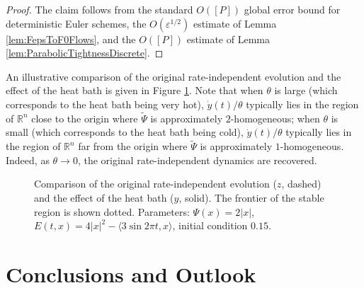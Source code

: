 \documentclass[reqno]{amsart}
\theoremstyle{definition}
\begin{document}
\begin{proof}
	The claim follows from the standard $O([P])$ global error bound for deterministic Euler schemes, the $O({\varepsilon}^{1/2})$ estimate of Lemma \ref{lem:FepsToF0Flows}, and the $O([P])$ estimate of Lemma \ref{lem:ParabolicTightnessDiscrete}.
\end{proof}

An illustrative comparison of the original rate-independent evolution and the effect of the heat bath is given in Figure \ref{fig:RI-Relaxed}.  Note that when $\theta$ is large (which corresponds to the heat bath being very hot), $\dot{y}(t) / \theta$ typically lies in the region of ${\mathbb{R}}^{n}$ close to the origin where ${\widetilde{\Psi}}$ is approximately $2$-homogeneous;  when $\theta$ is small (which corresponds to the heat bath being cold), $\dot{y}(t) / \theta$ typically lies in the region of ${\mathbb{R}}^{n}$ far from the origin where ${\widetilde{\Psi}}$ is approximately $1$-homogeneous.  Indeed, as $\theta \to 0$, the original rate-independent dynamics are recovered.

\begin{figure}[t]
	\begin{center}
	  \caption[Comparison of the rate-independent process and the effect of the heat bath.]{Comparison of the original rate-independent evolution ($z$, dashed) and the effect of the heat bath ($y$, solid).  The frontier of the stable region is shown dotted.  Parameters:  $\Psi(x) = 2 | x |$, $E(t, x) = 4 | x |^{2} - \langle 3 \sin 2 \pi t, x \rangle$, initial condition $0.15$.}
	  \label{fig:RI-Relaxed}
	\end{center}
\end{figure}

\section{Conclusions and Outlook}
\label{sec:conclusions}
\end{document}
